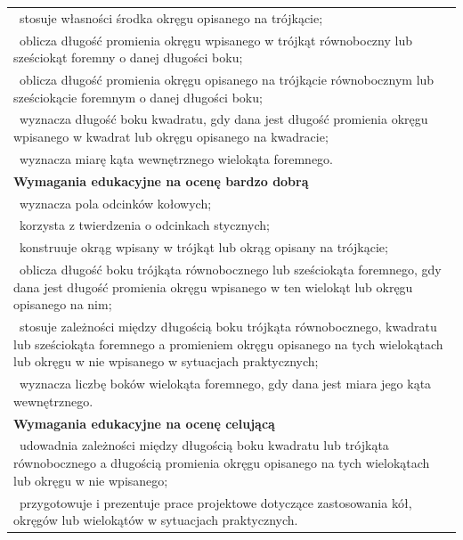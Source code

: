 \documentclass[12pt,a4paper]{article}
\begin{document}
\begin{longtable}{|p{16cm}|}
		\textbullet\ stosuje własności środka okręgu opisanego na trójkącie; \\
		
		\textbullet\ oblicza długość promienia okręgu wpisanego w trójkąt równoboczny lub sześciokąt foremny o danej długości boku; \\
		
		\textbullet\ oblicza długość promienia okręgu opisanego na trójkącie równobocznym lub sześciokącie foremnym o danej długości boku; \\
		
		\textbullet\ wyznacza długość boku kwadratu, gdy dana jest długość promienia okręgu wpisanego w kwadrat lub okręgu opisanego na kwadracie; \\
		
		\textbullet\ wyznacza miarę kąta wewnętrznego wielokąta foremnego. \\ \hline
		
		\textbf{Wymagania edukacyjne na ocenę bardzo dobrą} \\ \hline
		
		\textbullet\ wyznacza pola odcinków kołowych; \\
		
		\textbullet\ korzysta z twierdzenia o odcinkach stycznych; \\
		
		\textbullet\ konstruuje okrąg wpisany w trójkąt lub okrąg opisany na trójkącie; \\
		
		\textbullet\ oblicza długość boku trójkąta równobocznego lub sześciokąta foremnego, gdy dana jest długość promienia okręgu wpisanego w ten wielokąt lub okręgu opisanego na nim; \\
		
		\textbullet\ stosuje zależności między długością boku trójkąta równobocznego, kwadratu lub sześciokąta foremnego a promieniem okręgu opisanego na tych wielokątach lub okręgu w nie wpisanego w sytuacjach praktycznych; \\
		
		\textbullet\ wyznacza liczbę boków wielokąta foremnego, gdy dana jest miara jego kąta wewnętrznego. \\ \hline
		
		\textbf{Wymagania edukacyjne na ocenę celującą} \\ \hline
		
		\textbullet\ udowadnia zależności między długością boku kwadratu lub trójkąta równobocznego a długością promienia okręgu opisanego na tych wielokątach lub okręgu w nie wpisanego; \\
		
		\textbullet\ przygotowuje i prezentuje prace projektowe dotyczące zastosowania kół, okręgów lub wielokątów w sytuacjach praktycznych. \\ \hline
		
	\end{longtable}
	
\end{document}
